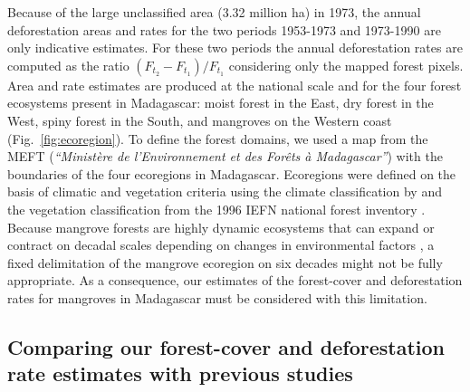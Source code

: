 \documentclass[a4paper, 12pt, leqno]{article} %
\begin{document}
Because of the large unclassified area (3.32 million ha) in 1973, the
annual deforestation areas and rates for the two periods 1953-1973 and
1973-1990 are only indicative estimates. For these two periods the
annual deforestation rates are computed as the ratio
$(F_{t_2}-F_{t_1})/F_{t_1}$ considering only the mapped forest pixels.
Area and rate estimates are produced at the national scale and for the
four forest ecosystems present in Madagascar: moist forest in the
East, dry forest in the West, spiny forest in the South, and mangroves
on the Western coast (Fig.~\ref{fig:ecoregion}). To define the forest
domains, we used a map from the MEFT (\emph{``Ministère de
  l'Environnement et des Forêts à Madagascar''}) with the boundaries
of the four ecoregions in Madagascar. Ecoregions were defined on the
basis of climatic and vegetation criteria using the climate
classification by \citet{Cornet1974} and the vegetation classification
from the 1996 IEFN national forest inventory \citep{IEFN1996}. Because
mangrove forests are highly dynamic ecosystems that can expand or
contract on decadal scales depending on changes in environmental
factors \citep{Armitage2015}, a fixed delimitation of the mangrove
ecoregion on six decades might not be fully appropriate. As a
consequence, our estimates of the forest-cover and deforestation rates
for mangroves in Madagascar must be considered with this limitation.

\subsection{Comparing our forest-cover and deforestation rate
estimates with previous studies}
\end{document}
